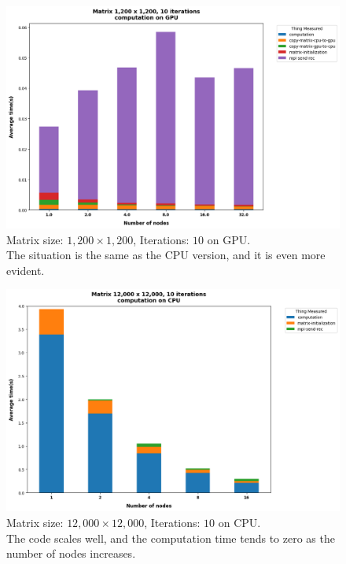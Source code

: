 \documentclass{article}
\begin{document}
    \begin{figure}
        \includegraphics[width=\textwidth]{./plots/plt02}
        \caption{Matrix size: $1,200 \times 1,200$, Iterations: $10$ on GPU.\\ The situation is the same as the CPU version, and it is even more evident.}
        \label{fig:figure1}
    \end{figure}

    \begin{figure}
        \includegraphics[width=\textwidth]{./plots/plt01}
        \caption{Matrix size: $12,000 \times 12,000$, Iterations: $10$ on CPU.\\ The code scales well, and the computation time tends to zero as the number of nodes increases.}
        \label{fig:figure2}
    \end{figure}
\end{document}
